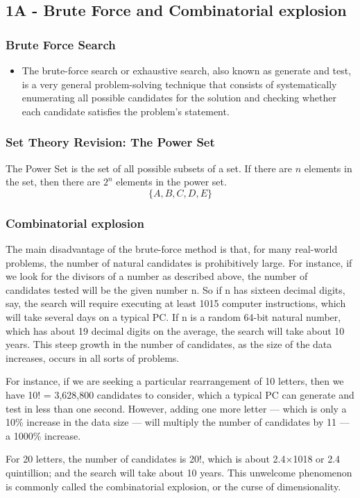 \documentclass{beamer}
\begin{document}
\subsection{1A - Brute Force and Combinatorial explosion}
\begin{frame}
\frametitle{Brute Force Search}
\begin{itemize}
\item The brute-force search or exhaustive search, also known as generate and test, is a very general problem-solving technique that consists of systematically enumerating all possible candidates for the solution and checking whether each candidate satisfies the problem's statement.
\end{itemize}
\end{frame}


\begin{frame}
\frametitle{Set Theory Revision: The Power Set}
The Power Set is the set of all possible subsets of a set. If there are $n$ elements in the set, then there are $2^n$ elements in the power set.
\[ \{A,B,C,D,E\}\]
\end{frame}


\begin{frame}
\frametitle{Combinatorial explosion}
The main disadvantage of the brute-force method is that, for many real-world problems, the number of natural candidates is prohibitively large. For instance, if we look for the divisors of a number as described above, the number of candidates tested will be the given number n. So if n has sixteen decimal digits, say, the search will require executing at least 1015 computer instructions, which will take several days on a typical PC. If n is a random 64-bit natural number, which has about 19 decimal digits on the average, the search will take about 10 years. This steep growth in the number of candidates, as the size of the data increases, occurs in all sorts of problems. 
\end{frame}


\begin{frame}
For instance, if we are seeking a particular rearrangement of 10 letters, then we have 10! = 3,628,800 candidates to consider, which a typical PC can generate and test in less than one second. However, adding one more letter — which is only a 10\% increase in the data size — will multiply the number of candidates by 11 — a 1000\% increase. 

For 20 letters, the number of candidates is 20!, which is about 2.4×1018 or 2.4 quintillion; and the search will take about 10 years. This unwelcome phenomenon is commonly called the combinatorial explosion, or the curse of dimensionality.
\end{frame}
\end{document}
